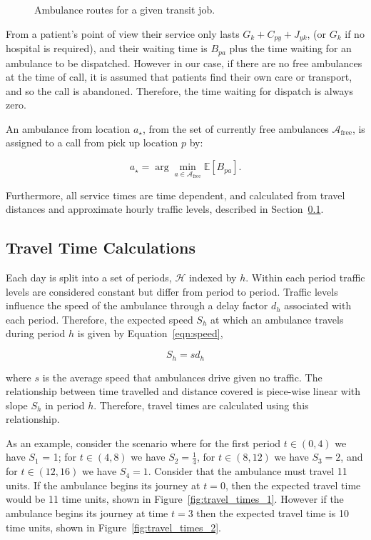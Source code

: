 \documentclass[preprint,12pt]{elsarticle}
\begin{document}
\begin{figure}
    \centering
    
    \caption{Ambulance routes for a given transit job.}
    \label{fig:travel_routes}
\end{figure}

From a patient's point of view their service only lasts $G_k + C_{py} + J_{yk}$,
(or $G_k$ if no hospital is required), and their waiting time is $B_{pa}$ plus the time waiting for an ambulance to be dispatched. However in our case, if there are no free ambulances at the time of call, it is assumed that patients find their own care or transport, and so the call is abandoned. Therefore, the time waiting for dispatch is always zero.

An ambulance from location $a_{\star}$, from the set of currently free
ambulances $\mathcal{A}_{\text{free}}$, is assigned to a call from pick up
location $p$ by:

\begin{equation}\label{eqn:choose_vehicle}
  a_{\star} = \arg\min_{a \in \mathcal{A}_{\text{free}}} \mathbb{E}\left[B_{pa}\right].
\end{equation}

Furthermore, all service times are time dependent, and calculated from travel
distances and approximate hourly traffic levels, described in
Section~\ref{sec:travel_times}.

\subsection{Travel Time Calculations}\label{sec:travel_times}
Each day is split into a set of periods, $\mathcal{H}$ indexed by $h$.
Within each period traffic levels are considered constant but differ from
period to period. Traffic levels influence the speed of the ambulance through a
delay factor $d_h$ associated with each period.
Therefore, the expected speed $S_h$ at which an ambulance travels during period
$h$ is given by Equation~\ref{eqn:speed},

\begin{equation}\label{eqn:speed}
S_h = s d_h
\end{equation}

where $s$ is the average speed that ambulances drive given no traffic.
The relationship between time travelled and distance covered is piece-wise linear
with slope $S_h$ in period $h$. Therefore, travel times are calculated using
this relationship.

As an example, consider the scenario where for the first period $t \in (0, 4)$ we
have $S_1$ = 1; for $t \in (4, 8)$ we have $S_2 = \frac{1}{4}$, for
$t \in (8, 12)$ we have $S_3 = 2$, and for $t \in (12, 16)$ we have $S_4 = 1$.
Consider that the ambulance must travel 11 units.
If the ambulance begins its journey at $t=0$, then the expected travel time
would be 11 time units, shown in Figure~\ref{fig:travel_times_1}.
However if the ambulance begins its journey at time $t=3$ then the expected
travel time is 10 time units, shown in Figure~\ref{fig:travel_times_2}.
\end{document}
